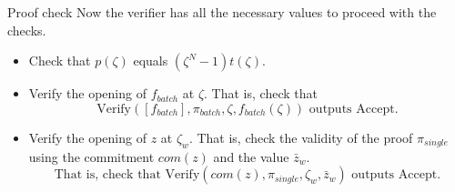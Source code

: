 \documentclass{zkdl-presentation-template}
\begin{document}
    \begin{frame} {Proof check}
        Now the verifier has all the necessary values to proceed with the checks.
        \begin{itemize}
            \item Check that $p(\zeta)$ equals $(\zeta^N - 1)t(\zeta)$.
            \item Verify the opening of $f_{batch}$ at $\zeta$. That is, check that 
                \begin{equation*}
                    \text{Verify}([f_{batch}], \pi_{batch}, \zeta, f_{batch}(\zeta)) \text{ outputs Accept.}
                \end{equation*}
            \item Verify the opening of $z$ at $\zeta_w$. That is, check the validity of the proof $\pi_{single}$ using the commitment $com(z)$ and the value $\bar{z}_w$. 
                \begin{equation*}
                    \text{That is, check that } \text{Verify}(com(z), \pi_{single}, \zeta_w, \bar{z}_w) \text{ outputs Accept.}
                \end{equation*}
        \end{itemize}
    \end{frame}
\end{document}
